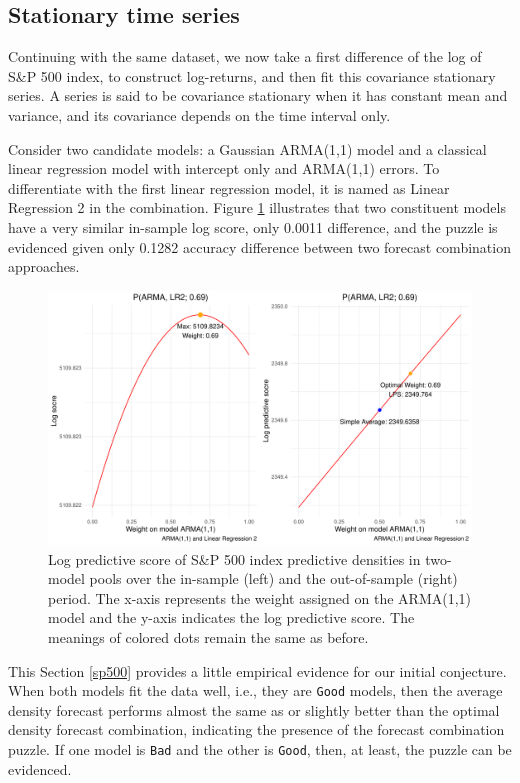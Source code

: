 \documentclass{monashthesis}
\begin{document}
\hypertarget{stationary-time-series}{%
\subsection{Stationary time series}\label{stationary-time-series}}

Continuing with the same dataset, we now take a first difference of the log of S\&P 500 index, to construct log-returns, and then fit this covariance stationary series. A series is said to be covariance stationary when it has constant mean and variance, and its covariance depends on the time interval only.

Consider two candidate models: a Gaussian ARMA(1,1) model and a classical linear regression model with intercept only and ARMA(1,1) errors. To differentiate with the first linear regression model, it is named as Linear Regression 2 in the combination. Figure \ref{fig:stat} illustrates that two constituent models have a very similar in-sample log score, only 0.0011 difference, and the puzzle is evidenced given only 0.1282 accuracy difference between two forecast combination approaches.

\begin{figure}[ht]
\centering
\includegraphics[scale=0.6]{figures/SP500_stationary.pdf}
\caption{Log predictive score of S\&P 500 index predictive densities in two-model pools over the in-sample (left) and the out-of-sample (right) period. The x-axis represents the weight assigned on the ARMA(1,1) model and the y-axis indicates the log predictive score. The meanings of colored dots remain the same as before.}
\label{fig:stat}
\end{figure}

This Section \ref{sp500} provides a little empirical evidence for our initial conjecture. When both models fit the data well, i.e., they are \texttt{Good} models, then the average density forecast performs almost the same as or slightly better than the optimal density forecast combination, indicating the presence of the forecast combination puzzle. If one model is \texttt{Bad} and the other is \texttt{Good}, then, at least, the puzzle can be evidenced.
\end{document}
